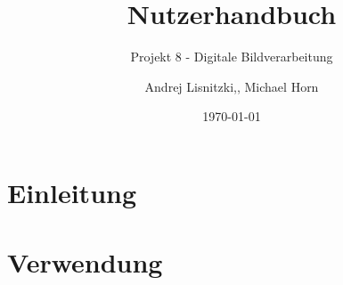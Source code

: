 						

\title{Nutzerhandbuch}
\subtitle{Projekt 8 - Digitale Bildverarbeitung}

\author{Andrej Lisnitzki,, Michael Horn\vspace{4cm}}
\date{\today}

\maketitle

\section{Einleitung}
\section{Verwendung}
